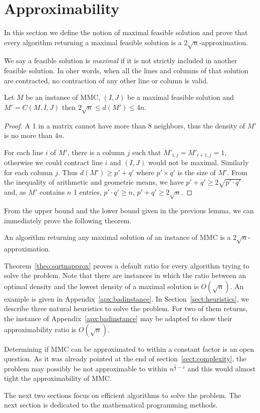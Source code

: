 \section{Approximability}
\label{sect:approx}

In this section we define the notion of maximal feasible solution and prove that every algorithm returning a maximal feasible solution is a $2\sqrt{n}$-approximation.

\begin{definition}
We say a feasible solution is \emph{maximal} if it is not strictly included in another feasible solution. In oher words, when all the lines and columns of that solution are contracted, no contraction of any other line or column is valid.
\end{definition}

\begin{lemma}
\label{lem:bounds}
Let $M$ be an instance of MMC, $(I,J)$ be a maximal feasible solution and $M' = C(M,I,J)$ then $2 \sqrt{n} \leq d(M') \leq 4n$.
\end{lemma}
\begin{proof}
A 1 in a matrix cannot have more than $8$ neighbors, thus the density of $M'$ is no more than $4n$.

For each line $i$ of $M'$, there is a column $j$ such that $M'_{i,j} = M'_{i+1,j} = 1$, otherwise we could contract line $i$ and $(I,J)$ would not be maximal. Similarly for each column $j$. Thus $d(M') \geq p'+q'$ where $p' \times q'$ is the size of $M'$. From the inequality of arithmetic and geometric means, we have $p' + q ' \geq 2 \sqrt{p'\cdot q'}$ and, as $M'$ contains $n$ 1 entries, $p'\cdot q' \geq n$, $p' + q ' \geq 2 \sqrt{n}$.
\end{proof}

From the upper bound and the lower bound given in the previous lemma, we can immediately prove the following theorem. 

\begin{theorem}
	\label{theo:sqrtnapprox}
An algorithm returning any maximal solution of an instance of MMC is a $2\sqrt{n}$-approximation.
\end{theorem}

Theorem~\ref{theo:sqrtnapprox} proves a default ratio for every algorithm trying to solve the problem. Note that there are instances in which the ratio between an optimal density and the lowest density of a maximal solution is $O(\sqrt{n})$. An example is given in Appendix~\ref{apx:badinstance}. In Section~\ref{sect:heuristics}, we describe three natural heuristics to solve the problem. For two of them returns, the instance of Appendix~\ref{apx:badinstance} may be adapted to show their approximability ratio is $O(\sqrt{n})$. 

Determining if MMC can be approximated to within a constant factor is an open question. As it was already pointed at the end of section~\ref{sect:complexity}, the problem may possibly be not approximable to within $n^{\frac{1}{2}-\varepsilon}$ and this would almost tight the approximability of MMC.

The next two sections focus on efficient algorithms to solve the problem. The next section is dedicated to the mathematical programming methods.